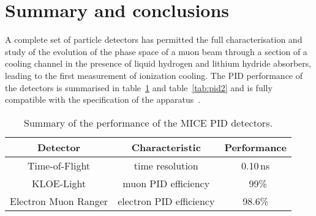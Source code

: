 \graphicspath{{80-Conclusions/Figures/}}

\section{Summary and conclusions}
\label{Sect:Conclusions}

A complete set of particle detectors has permitted the full characterisation and study of the evolution of the phase space of a muon beam through a section of a cooling channel in the presence of liquid hydrogen and lithium hydride absorbers, leading to the first measurement of ionization cooling.
The PID performance of the detectors is summarised in table~\ref{tab:pid1} and table~\ref{tab:pid2} and is fully compatible with the specification of the apparatus~\cite{NOTE21}.

\begin{table}[htb!]
	\caption{Summary of the performance of the MICE PID detectors.}
  \begin{center}
	\begin{tabular}{|c|c|c|}
   	\hline
	  \textbf{Detector}              & \textbf{Characteristic}            & \textbf{Performance} \\
		\hline
    Time-of-Flight        & time resolution           & 0.10\,ns    \\
    KLOE-Light            & muon PID efficiency       & ~99\%       \\
    Electron Muon Ranger  & electron PID efficiency   & 98.6\%      \\
    \hline
  \end{tabular}
	\label{tab:pid1}
  \end{center}
\end{table}


